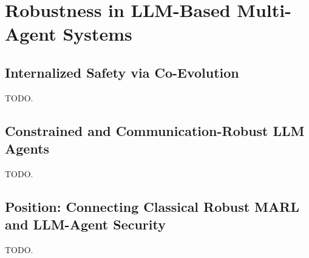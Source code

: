 \section{Robustness in LLM-Based Multi-Agent Systems}
\label{sec:llm}

\subsection{Internalized Safety via Co-Evolution}
TODO.

\subsection{Constrained and Communication-Robust LLM Agents}
TODO.

\subsection{Position: Connecting Classical Robust MARL and LLM-Agent Security}
TODO.

